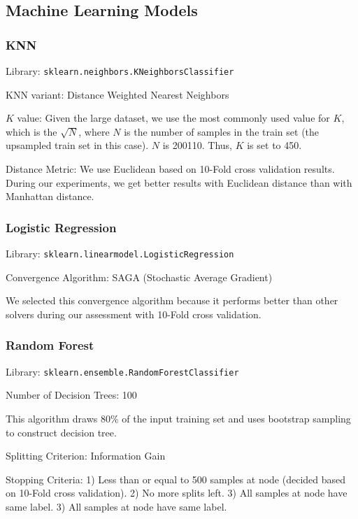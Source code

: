 \documentclass{article}
\begin{document}
\subsection{Machine Learning Models}
\subsubsection{KNN}

Library: \texttt{sklearn.neighbors.KNeighborsClassifier}~\cite{knnlib}

KNN variant: Distance Weighted Nearest Neighbors

$K$ value: Given the large dataset, we use the most commonly used value for $K$, which is the $\sqrt N$, where $N$ is the number of samples in the train set (the upsampled train set in this case). $N$ is 200110. Thus, $K$ is set to 450.

Distance Metric: We use Euclidean based on 10-Fold cross validation results. During our experiments, we get better results with Euclidean distance than with Manhattan distance.




\subsubsection{Logistic Regression}

Library: \texttt{sklearn.linearmodel.LogisticRegression}~\cite{lrlib}

Convergence Algorithm: SAGA (Stochastic Average Gradient)

We selected this convergence algorithm because it performs better than other solvers during our assessment with 10-Fold cross validation.




\subsubsection{Random Forest}

Library: \texttt{sklearn.ensemble.RandomForestClassifier}~\cite{rflib}

Number of Decision Trees: 100

This algorithm draws 80\% of the input training set and uses bootstrap sampling to construct decision tree. 

Splitting Criterion: Information Gain

Stopping Criteria: 1)  Less than or equal to 500 samples at node (decided based on 10-Fold cross validation). 2) No more splits left.
3)  All samples at node have same label.
3)  All samples at node have same label.
\end{document}
